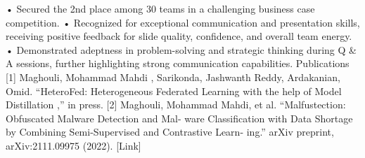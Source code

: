 • Secured the 2nd place among 30 teams in a challenging business case competition.
• Recognized for exceptional communication and presentation skills, receiving positive feedback for
slide quality, confidence, and overall team energy.
• Demonstrated adeptness in problem-solving and strategic thinking during Q & A sessions, further
highlighting strong communication capabilities.
Publications
[1] Maghouli, Mohammad Mahdi , Sarikonda, Jashwanth Reddy, Ardakanian, Omid. “HeteroFed:
Heterogeneous Federated Learning with the help of Model Distillation ,” in press.
[2] Maghouli, Mohammad Mahdi, et al. “Malfustection: Obfuscated Malware Detection and Mal-
ware Classification with Data Shortage by Combining Semi-Supervised and Contrastive Learn-
ing.” arXiv preprint, arXiv:2111.09975 (2022). [Link]